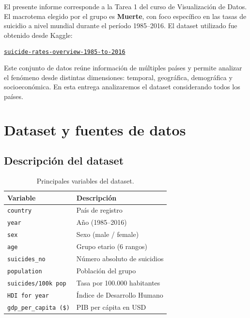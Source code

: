 \documentclass[12pt, letterpaper]{article}
\begin{document}
El presente informe corresponde a la Tarea 1 del curso de Visualización de Datos. El macrotema
elegido por el grupo es \textbf{Muerte}, con foco específico en las tasas de suicidio a nivel mundial
durante el período 1985--2016. El dataset utilizado fue obtenido desde Kaggle:

\begin{center}
  \href{https://www.kaggle.com/datasets/russellyates88/suicide-rates-overview-1985-to-2016}%
  {\texttt{suicide-rates-overview-1985-to-2016}}
\end{center}

Este conjunto de datos reúne información de múltiples países y permite analizar el fenómeno desde
distintas dimensiones: temporal, geográfica, demográfica y socioeconómica. En esta entrega analizaremos el dataset considerando todos los países.

\section{Dataset y fuentes de datos}

\subsection{Descripción del dataset}

\begin{table}[H]
  \centering
  \caption{Principales variables del dataset.}
  \begin{tabular}{lp{9cm}}
    \toprule
    \textbf{Variable} & \textbf{Descripción} \\
    \midrule
    \texttt{country}        & País de registro \\
    \texttt{year}           & Año (1985--2016) \\
    \texttt{sex}            & Sexo (male / female) \\
    \texttt{age}            & Grupo etario (6 rangos) \\
    \texttt{suicides\_no}   & Número absoluto de suicidios \\
    \texttt{population}     & Población del grupo \\
    \texttt{suicides/100k pop} & Tasa por 100.000 habitantes \\
    \texttt{HDI for year}   & Índice de Desarrollo Humano \\
    \texttt{gdp\_per\_capita (\$)} & PIB per cápita en USD \\
    \bottomrule
  \end{tabular}
\end{table}
\end{document}
